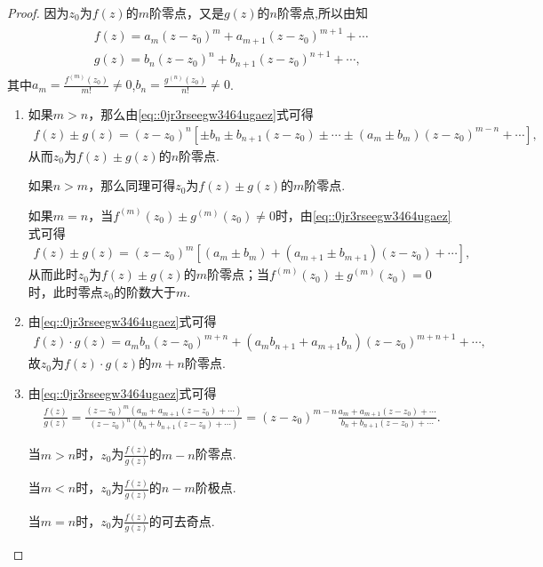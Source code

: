 \documentclass[../../main.tex]{subfiles}%
\begin{document}
\begin{proof}
因为$z_0$为$f(z)$的$m$阶零点，又是$g(z)$的$n$阶零点,所以由知
\begin{align}\label{eq::0jr3rseegw3464ugaez}
\begin{gathered}
f(z)=a_m(z-z_0)^m+a_{m+1}(z-z_0)^{m+1}+\cdots
\\
g(z)=b_n(z-z_0)^n+b_{n+1}(z-z_0)^{n+1}+\cdots,
\end{gathered}
\end{align}
其中$a_m=\frac{f^{\left( m \right)}\left( z_0 \right)}{m!}\neq0$,$b_n=\frac{g^{\left( n \right)}\left( z_0 \right)}{n!}\neq0$.
\begin{enumerate}[(1)]
\item 如果$m>n$，那么由\eqref{eq::0jr3rseegw3464ugaez}式可得
\begin{align*}
f(z)\pm g(z)=(z-z_0)^n\left[\pm b_n\pm b_{n+1}(z-z_0)\pm \cdots\pm (a_m\pm b_m)(z-z_0)^{m-n}+\cdots\right],
\end{align*}
从而$z_0$为$f(z)\pm g(z)$的$n$阶零点.

如果$n>m$，那么同理可得$z_0$为$f(z)\pm g(z)$的$m$阶零点.

如果$m=n$，当$f^{\left( m \right)}\left( z_0 \right) \pm g^{\left( m \right)}\left( z_0 \right) \neq0$时，由\eqref{eq::0jr3rseegw3464ugaez}式可得
\begin{align*}
f(z)\pm g(z)=(z-z_0)^m\left[ \left( a_m\pm b_m \right) +\left( a_{m+1}\pm b_{m+1} \right) (z-z_0)+\cdots \right] ,
\end{align*}
从而此时$z_0$为$f(z)\pm g(z)$的$m$阶零点；当$f^{\left( m \right)}\left( z_0 \right) \pm g^{\left( m \right)}\left( z_0 \right) =0$时，此时零点$z_0$的阶数大于$m$.

\item 由\eqref{eq::0jr3rseegw3464ugaez}式可得
\begin{align*}
f(z)\cdot g(z)=a_mb_n(z-z_0)^{m+n}+(a_mb_{n+1}+a_{m+1}b_n)(z-z_0)^{m+n+1}+\cdots,
\end{align*}
故$z_0$为$f(z)\cdot g(z)$的$m+n$阶零点.

\item 由\eqref{eq::0jr3rseegw3464ugaez}式可得
\begin{align*}
\frac{f(z)}{g(z)}=\frac{(z-z_0)^m(a_m+a_{m+1}(z-z_0)+\cdots)}{(z-z_0)^n(b_n+b_{n+1}(z-z_0)+\cdots)}=(z-z_0)^{m-n}\frac{a_m+a_{m+1}(z-z_0)+\cdots}{b_n+b_{n+1}(z-z_0)+\cdots}.
\end{align*}

当$m>n$时，$z_0$为$\frac{f(z)}{g(z)}$的$m-n$阶零点.

当$m<n$时，$z_0$为$\frac{f(z)}{g(z)}$的$n-m$阶极点.

当$m=n$时，$z_0$为$\frac{f(z)}{g(z)}$的可去奇点.
\end{enumerate}
\end{proof}
\end{document}
